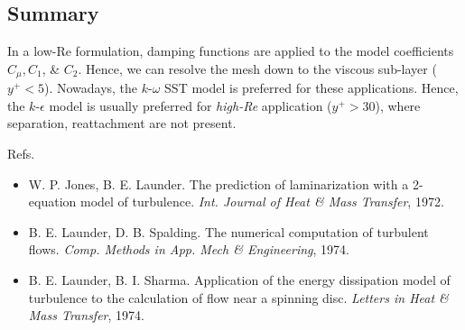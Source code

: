\documentclass[oneside]{book}
\numberwithin{equation}{section}
\begin{document}
\subsection{Summary}
In a low-Re formulation, damping functions are applied to the model coefficients $C_\mu,C_1$, \& $C_2$. Hence, we can resolve the mesh down to the viscous sub-layer ($y^+ < 5$). Nowadays, the $k$-$\omega$ SST model is preferred for these applications. Hence, the $k$-$\epsilon$ model is usually preferred for \textit{high-Re} application ($y^+ > 30$), where separation, reattachment are not present.

Refs.
\begin{itemize}
	\item W. P. Jones, B. E. Launder. The prediction of laminarization with a 2-equation model of turbulence. \textit{Int. Journal of Heat \& Mass Transfer}, 1972.
	\item B. E. Launder, D. B. Spalding. The numerical computation of turbulent flows. \textit{Comp. Methods in App. Mech \& Engineering}, 1974.
	\item B. E. Launder, B. I. Sharma. Application of the energy dissipation model of turbulence to the calculation of flow near a spinning disc. \textit{Letters in Heat \& Mass Transfer}, 1974.
\end{itemize}


\begin{thebibliography}{99}
	\bibitem[]{}
\end{thebibliography}


\printbibliography[heading=bibintoc]
	
\end{document}
